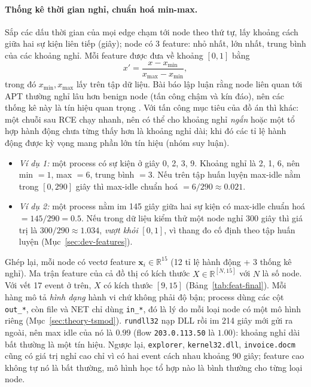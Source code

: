 \paragraph{Thống kê thời gian nghỉ, chuẩn hoá min-max.}
Sắp các dấu thời gian của mọi edge chạm tới node theo thứ tự, lấy khoảng cách giữa hai sự kiện liên tiếp (giây); node có 3 feature: nhỏ nhất, lớn nhất, trung bình của các khoảng nghỉ. Mỗi feature được đưa về khoảng $[0, 1]$ bằng
\[
x' = \frac{x - x_{\min}}{x_{\max} - x_{\min}},
\]
trong đó $x_{\min}, x_{\max}$ lấy trên tập dữ liệu. Bài báo lập luận rằng node liên quan tới APT thường nghỉ lâu hơn benign node (tấn công chậm và kín đáo), nên các thống kê này là tín hiệu quan trọng \cite{aly2025ocrapt}. Với tấn công mục tiêu của đồ án thì khác: một chuỗi sau RCE chạy nhanh, nên có thể cho khoảng nghỉ \emph{ngắn} hoặc một tổ hợp hành động chưa từng thấy hơn là khoảng nghỉ dài; khi đó các tỉ lệ hành động được kỳ vọng mang phần lớn tín hiệu (nhóm suy luận).
\begin{itemize}
    \item \emph{Ví dụ 1:} một process có sự kiện ở giây 0, 2, 3, 9. Khoảng nghỉ là 2, 1, 6, nên min $= 1$, max $= 6$, trung bình $= 3$. Nếu trên tập huấn luyện max-idle nằm trong $[0, 290]$ giây thì max-idle chuẩn hoá $= 6/290 \approx 0.021$.
    \item \emph{Ví dụ 2:} một process nằm im 145 giây giữa hai sự kiện có max-idle chuẩn hoá $= 145/290 = 0.5$. Nếu trong dữ liệu kiểm thử một node nghỉ 300 giây thì giá trị là $300/290 \approx 1.034$, \emph{vượt khỏi} $[0, 1]$, vì thang đo cố định theo tập huấn luyện (Mục~\ref{sec:dev-features}).
\end{itemize}

Ghép lại, mỗi node có vectơ feature $\mathbf{x}_i \in \mathbb{R}^{15}$ (12 tỉ lệ hành động + 3 thống kê nghỉ). Ma trận feature của cả đồ thị có kích thước $X \in \mathbb{R}^{[N, 15]}$ với $N$ là số node. Với vết 17 event ở trên, $X$ có kích thước $[9, 15]$ (Bảng~\ref{tab:feat-final}). Mỗi hàng mô tả \emph{hình dạng} hành vi chứ không phải độ bận; process dùng các cột \texttt{out\_*}, còn file và NET chỉ dùng \texttt{in\_*}, đó là lý do mỗi loại node có một mô hình riêng (Mục~\ref{sec:theory-tsmod}). \texttt{rundll32} nạp DLL rồi im 214 giây mới gửi ra ngoài, nên max idle của nó là $0.99$ (flow \texttt{203.0.113.50} là $1.00$): khoảng nghỉ dài bất thường là một tín hiệu. Ngược lại, \texttt{explorer}, \texttt{kernel32.dll}, \texttt{invoice.docm} cũng có giá trị nghỉ cao chỉ vì có hai event cách nhau khoảng 90 giây; feature cao không tự nó là bất thường, mô hình học tổ hợp nào là bình thường cho từng loại node.

